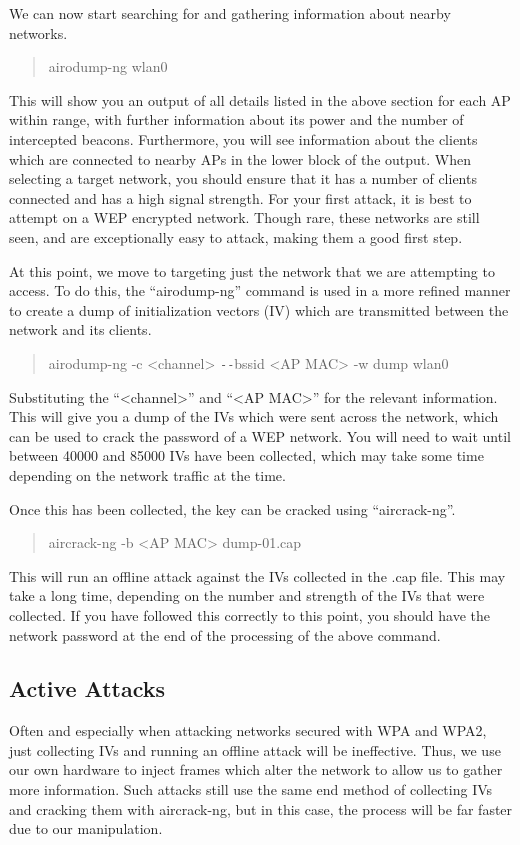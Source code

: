 \documentclass[a4paper,11pt]{report}
\begin{document}
			We can now start searching for and gathering information about nearby networks. 
			\begin{quote}
				airodump-ng wlan0
			\end{quote}
			This will show you an output of all details listed in the above section for each AP within range, with further information about its power and the number of intercepted beacons. 
			Furthermore, you will see information about the clients which are connected to nearby APs in the lower block of the output. 
			When selecting a target network, you should ensure that it has a number of clients connected and has a high signal strength. 
			For your first attack, it is best to attempt on a WEP encrypted network. 
			Though rare, these networks are still seen, and are exceptionally easy to attack, making them a good first step. 

			At this point, we move to targeting just the network that we are attempting to access. 
			To do this, the ``airodump-ng'' command is used in a more refined manner to create a dump of initialization vectors (IV) which are transmitted between the network and its clients. 
			\begin{quote}
				airodump-ng -c <channel> \verb+--+bssid <AP MAC> -w dump wlan0
			\end{quote}
			Substituting the ``<channel>'' and ``<AP MAC>'' for the relevant information. 
			This will give you a dump of the IVs which were sent across the network, which can be used to crack the password of a WEP network. 
			You will need to wait until between 40000 and 85000 IVs have been collected, which may take some time depending on the network traffic at the time. 
			
			Once this has been collected, the key can be cracked using ``aircrack-ng''.
			\begin{quote}
				aircrack-ng -b <AP MAC> dump-01.cap
			\end{quote}
			This will run an offline attack against the IVs collected in the .cap file.
			This may take a long time, depending on the number and strength of the IVs that were collected.
			If you have followed this correctly to this point, you should have the network password at the end of the processing of the above command. 
		\subsection{Active Attacks}
			Often and especially when attacking networks secured with WPA and WPA2, just collecting IVs and running an offline attack will be ineffective. 
			Thus, we use our own hardware to inject frames which alter the network to allow us to gather more information. 
			Such attacks still use the same end method of collecting IVs and cracking them with aircrack-ng, but in this case, the process will be far faster due to our manipulation. 
\end{document}
